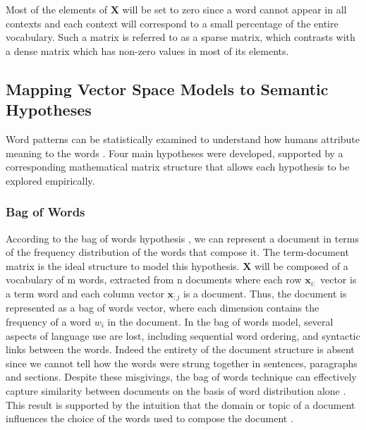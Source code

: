 Most of the elements of $\textbf{X}$ will be set to zero since a word cannot appear in all contexts and each context will correspond to a small percentage of the entire vocabulary.  Such a matrix is referred to as a sparse matrix, which contrasts with a dense matrix which has non-zero values in most of its elements.

\subsection{Mapping Vector Space Models to Semantic Hypotheses}
Word patterns can be statistically examined to understand how humans attribute meaning to the words \citep{turney2010frequency}.  Four main hypotheses were developed, supported by a corresponding mathematical matrix structure that allows each hypothesis to be explored empirically.

\subsubsection{Bag of Words}
According to the bag of words hypothesis \citep{salton1975vector}, we can represent a document in terms of the frequency distribution of the words that compose it.  The term-document matrix is the ideal structure to model this hypothesis.  $\textbf{X}$ will be composed of a vocabulary of m words, extracted from n documents where each row $\textbf{x}_{i:}$ vector is a term word and each column vector $\textbf{x}_{:j}$ is a document.  Thus, the document is represented as a bag of words vector, where each dimension contains the frequency of a word $w_i$ in the document.  In the bag of words model, several aspects of language use are lost, including sequential word ordering, and syntactic links between the words.  Indeed the entirety of the document structure is absent since we cannot tell how the words were strung together in sentences, paragraphs and sections.    Despite these misgivings, the bag of words technique can effectively capture similarity between documents on the basis of word distribution alone \citep{turney2010frequency}.  This result is supported by the intuition that the domain or topic of a document influences the choice of the words used to compose the document \citep{turney2010frequency}.

